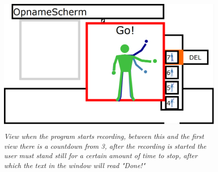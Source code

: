 \begin{figure}[H]
	\begin{center}
		\includegraphics[width=12.5cm, height=7cm]{figures/6_record_start.png}
		\caption{\emph{View when the program starts recording, between this and the first view there is a countdown from 3, after the recording is started the user must stand still for a certain amount of time to stop, after which the text in the window will read "Done!"}}
		\label{last recording screen}
	\end{center}
\end{figure}

